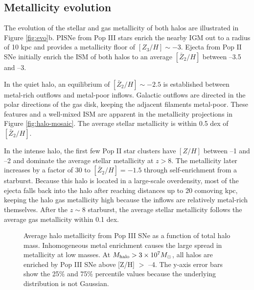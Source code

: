 \documentclass[apj]{emulateapj}
\begin{document}
\subsection{Metallicity evolution}

The evolution of the stellar and gas metallicity of both halos are
illustrated in Figure \ref{fig:evo}b.  PISNe from Pop III stars enrich
the nearby IGM out to a radius of 10 kpc and provides a metallicity
floor of $[Z_3/H] \sim -3$.  Ejecta from Pop II SNe initially enrich
the ISM of both halos to an average $[\bar{Z}_2/H]$ between --3.5 and
--3.

In the quiet halo, an equilibrium of $[\bar{Z}_2/H] \sim -2.5$ is
established between metal-rich outflows and metal-poor inflows.
Galactic outflows are directed in the polar directions of the gas
disk, keeping the adjacent filaments metal-poor.  These features and a
well-mixed ISM \citep[cf.][]{Wise08_Gal, Greif10} are apparent in the
metallicity projections in Figure \ref{fig:halo-mosaic}.  The average
stellar metallicity is within 0.5 dex of $[\bar{Z}_2/H]$.

In the intense halo, the first few Pop II star clusters have $[Z/H]$
between --1 and --2 and dominate the average stellar metallicity at $z
> 8$.  The metallicity later increases by a factor of 30 to
$[\bar{Z}_2/H] = -1.5$ through self-enrichment from a starburst.
Because this halo is located in a large-scale overdensity, most of the
ejecta falls back into the halo after reaching distances up to 20
comoving kpc, keeping the halo gas metallicity high because the
inflows are relatively metal-rich themselves.  After the $z \sim 8$
starburst, the average stellar metallicity follows the average gas
metallicity within 0.1 dex.


\begin{figure}
\caption{\label{fig:z3} Average halo metallicity from Pop III SNe as a
  function of total halo mass.  Inhomogeneous metal enrichment causes
  the large spread in metallicity at low masses.  At $M_{\rm halo} > 3
  \times 10^7 \Ms$, all halos are enriched by Pop III SNe above [Z/H]
  $>$ --4.  The y-axis error bars show the 25\% and 75\% percentile
  values because the underlying distribution is not Gaussian.}
\end{figure}

\end{document}
